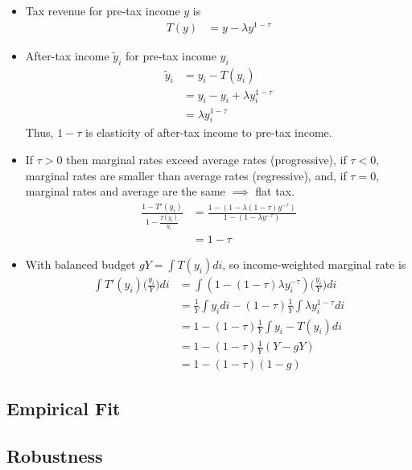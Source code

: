 \documentclass{article}
\begin{document}
\begin{itemize}
\item Tax revenue for pre-tax income $y$ is
\begin{align}
T(y) &= y - \lambda y^{1 - \tau} \label{tax_function}
\end{align}
\item After-tax income $\tilde y_i$ for pre-tax income $y_i$
\begin{align}
\tilde y_i 
&= y_i - T(y_i) \nonumber \\
&= y_i - y_i + \lambda y_i^{1 - \tau} \nonumber \\
&= \lambda y_i^{1-\tau} 
\end{align}
Thus, $1-\tau$ is elasticity of after-tax income to pre-tax income.
\item If $\tau > 0$ then marginal rates exceed average rates (progressive), if $\tau < 0$, marginal rates are smaller than average rates (regressive), and, if $\tau = 0$, marginal rates and average are the same $\implies$ flat tax.
\begin{align}
\frac{1 - T'(y_i)}{1 - \frac{T(y_i)}{y_i}} 
&= \frac{1 - (1 - \lambda (1-\tau)y^{- \tau}) }{1 - (1-\lambda y^{-\tau})} \nonumber \\
&=1 - \tau
\end{align}
\item With balanced budget $g Y = \int T(y_i)di$, so income-weighted marginal rate is
\begin{align}
\int T'(y_i) \Bigg( \frac{y_i}{Y} \Bigg) di 
&= \int (1 - (1-\tau)\lambda y_i^{-\tau}) \Bigg( \frac{y_i}{Y} \Bigg) di   \nonumber \\
&= \frac{1}{Y}\int y_i di - (1-\tau)\frac{1}{Y}\int \lambda y_i^{1-\tau} di   \nonumber \\
&= 1 - (1-\tau)\frac{1}{Y}\int y_i -T(y_i) di   \nonumber \\
&= 1 - (1-\tau)\frac{1}{Y}(Y - gY)   \nonumber \\
&= 1 - (1-\tau)(1-g)
\end{align}
\end{itemize}

\subsection{Empirical Fit}

\subsection{Robustness}
\end{document}

